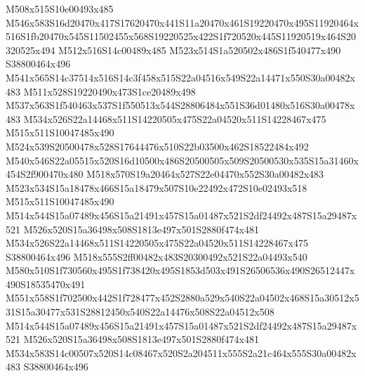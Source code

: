 \documentclass{article}
\begin{document}
\begin{multicols}{2}
M508x515S10e00493x485 M546x583S16d20470x417S17620470x441S11a20470x461S19220470x495S11920464x516S1fb20470x545S11502455x568S19220525x422S1f720520x445S11920519x464S20320525x494 M512x516S14c00489x485 M523x514S1a520502x486S1f540477x490 S38800464x496 M541x565S14c37514x516S14c3f458x515S22a04516x549S22a14471x550S30a00482x483 M511x528S19220490x473S1ce20489x498 M537x563S1f540463x537S1f550513x544S28806484x551S36d01480x516S30a00478x483 M534x526S22a14468x511S14220505x475S22a04520x511S14228467x475 M515x511S10047485x490 M524x539S20500478x528S17644476x510S22b03500x462S18522484x492 M540x546S22a05515x520S16d10500x486S20500505x509S20500530x535S15a31460x454S2f900470x480 M518x570S19a20464x527S22e04470x552S30a00482x483 M523x534S15a18478x466S15a18479x507S10e22492x472S10e02493x518 M515x511S10047485x490 M514x544S15a07489x456S15a21491x457S15a01487x521S2df24492x487S15a29487x521 M526x520S15a36498x508S1813e497x501S2880f474x481 M534x526S22a14468x511S14220505x475S22a04520x511S14228467x475 S38800464x496 M518x555S2ff00482x483S20300492x521S22a04493x540 M580x510S1f730560x495S1f738420x495S1853d503x491S26506536x490S26512447x490S18535470x491 M551x558S1f702500x442S1f728477x452S2880a529x540S22a04502x468S15a30512x531S15a30477x531S28812450x540S22a14476x508S22a04512x508 M514x544S15a07489x456S15a21491x457S15a01487x521S2df24492x487S15a29487x521 M526x520S15a36498x508S1813e497x501S2880f474x481 M534x583S14c00507x520S14c08467x520S2a204511x555S2a21c464x555S30a00482x483 S38800464x496


\end{multicols}
\end{document}
